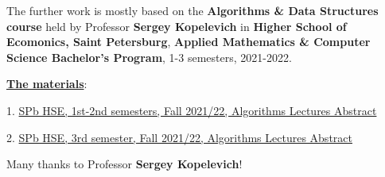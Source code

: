 
The further work is mostly based on the \textbf{Algorithms \& Data Structures course} held by Professor \textbf{Sergey Kopelevich} in \textbf{Higher School of Ecomonics, Saint Petersburg}, \textbf{Applied Mathematics \& Computer Science Bachelor's Program}, 1-3 semesters, 2021-2022.

\underline{\textbf{The materials}}:

1. \href{https://acm.math.spbu.ru/~sk1/courses/2122f_au/conspect/conspect.pdf}{SPb HSE, 1st-2nd semesters, Fall 2021/22, Algorithms Lectures Abstract}

2. \href{https://acm.math.spbu.ru/~sk1/courses/2122f_au2/conspect/conspect.pdf}{SPb HSE, 3rd semester, Fall 2021/22, Algorithms Lectures Abstract}

Many thanks to Professor \textbf{Sergey Kopelevich}!
